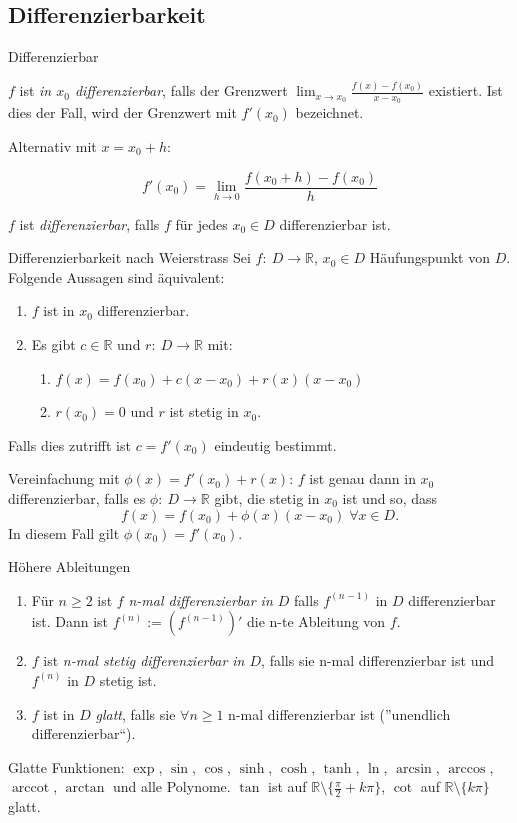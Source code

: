 \documentclass[a4paper,10pt]{article}
\def\R{\mathbb{R}}
\DeclareMathOperator{\arccot}{arccot}
\begin{document}
\subsection{Differenzierbarkeit}
\begin{mainbox}{Differenzierbar}
\begin{mainbox}{}
 $f$ ist \emph{in $x_0$ differenzierbar}, falls der Grenzwert $\lim_{x\to x_0} \frac{f(x) - f(x_0)}{x - x_0}$ existiert. Ist dies der Fall, wird der Grenzwert mit $f'(x_0)$ bezeichnet.
\end{mainbox}

Alternativ mit $x = x_0 + h$:
\begin{subbox}{}
\[ f'(x_0) = \lim_{h \to 0} \frac{f(x_0 + h) - f(x_0)}{h} \]
\end{subbox}

 $f$ ist \emph{differenzierbar}, falls $f$ für jedes $x_0 \in D$ differenzierbar ist.
\end{mainbox}
\begin{subbox}{Differenzierbarkeit nach Weierstrass}
Sei $f: \: D \to \R$, $x_0 \in D$ Häufungspunkt von $D$. Folgende Aussagen sind äquivalent:
\begin{enumerate}
    \item $f$ ist in $x_0$ differenzierbar.
    \item Es gibt $c \in \R$ und $r: \: D \to \R$ mit:
    \begin{enumerate}
        \item $f(x) = f(x_0) + c(x - x_0) + r(x)(x - x_0)$
        \item $r(x_0) = 0$ und $r$ ist stetig in $x_0$.
    \end{enumerate}
\end{enumerate}
Falls dies zutrifft ist $c = f'(x_0)$ eindeutig bestimmt.
\end{subbox}
Vereinfachung mit $\phi(x) = f'(x_0) + r(x)$:
$f$ ist genau dann in $x_0$ differenzierbar, falls es $\phi: \: D \to \R$ gibt, die stetig in $x_0$ ist und so, dass
\[ f(x) = f(x_0) + \phi(x)(x - x_0) \; \forall x \in D \text{.} \]
In diesem Fall gilt $\phi(x_0) = f'(x_0)$.

\begin{mainbox}{Höhere Ableitungen}
 \begin{enumerate}
  \item Für $n \ge 2$ ist $f$ \emph{n-mal differenzierbar in $D$} falls $f^{(n-1)}$ in $D$ differenzierbar ist. Dann ist $f^{(n)} := (f^{(n-1)})'$ die n-te Ableitung von $f$.
  \item $f$ ist \emph{n-mal stetig differenzierbar in $D$}, falls sie n-mal differenzierbar ist und $f^{(n)}$ in $D$ stetig ist.
  \item $f$ ist in $D$ \emph{glatt}, falls sie $\forall n \ge 1$ n-mal differenzierbar ist (''unendlich differenzierbar``).
 \end{enumerate}
\end{mainbox}
Glatte Funktionen: $\exp$, $\sin$, $\cos$, $\sinh$, $\cosh$, $\tanh$, $\ln$, $ \arcsin$, $\arccos$, $\arccot$, $\arctan$ und alle Polynome. $\tan$ ist auf $\R \setminus \{\frac{\pi}{2} + k\pi\}$, $\cot$ auf $\R \setminus \{k\pi\}$ glatt.
\end{document}
